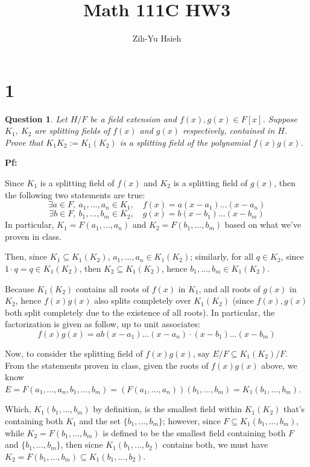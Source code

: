 \documentclass{article}
\title{Math 111C HW3}
\author{Zih-Yu Hsieh}
\newtheorem{question}{Question}
\begin{document}
\maketitle

\section*{1}
\begin{myBox}[]{}
    \begin{question}
        Let $H/F$ be a field extension and $f(x), g(x) \in F[x]$. Suppose $K_1,\ K_2$ are splitting
        fields of $f(x)$ and $g(x)$ respectively, contained in $H$. Prove that $K_1K_2:=K_1(K_2)$ is a
        splitting field of the polynomial $f(x)g(x)$.
    \end{question}
\end{myBox}

\textbf{Pf:}

Since $K_1$ is a splitting field of $f(x)$ and $K_2$ is a splitting field of $g(x)$, then the following two statements are true:
$$\exists a\in F,\ a_1,...,a_n\in K_1,\quad f(x)=a(x-a_1)...(x-a_n)$$
$$\exists b\in F,\ b_1,...,b_m\in K_2,\quad g(x)=b(x-b_1)...(x-b_m)$$
In particular, $K_1=F(a_1,...,a_n)$ and $K_2=F(b_1,...,b_m)$ based on what we've proven in class.

Then, since $K_1\subseteq K_1(K_2)$, $a_1,...,a_n\in K_1(K_2)$; similarly, for all $q\in K_2$, since $1\cdot q=q\in K_1(K_2)$, then $K_2\subseteq K_1(K_2)$, hence $b_1,...,b_m\in K_1(K_2)$.

Because $K_1(K_2)$ contains all roots of $f(x)$ in $K_1$, and all roots of $g(x)$ in $K_2$, hence $f(x)g(x)$ also splits completely over $K_1(K_2)$ (since $f(x),g(x)$ both split completely due to the existence of all roots).
In particular, the factorization is given as follow, up to unit associates:
$$f(x)g(x)=ab(x-a_1)...(x-a_n)\cdot (x-b_1)...(x-b_m)$$

\hfil

Now, to consider the splitting field of $f(x)g(x)$, say $E/F\subseteq K_1(K_2)/F$. From the statements proven in class, given the roots of $f(x)g(x)$ above, we know $E=F(a_1,...,a_n,b_1,...,b_m) = \left(F(a_1,...,a_n)\right)(b_1,...,b_m)=K_1(b_1,...,b_m)$.

Which, $K_1(b_1,...,b_m)$ by definition, is the smallest field within $K_1(K_2)$ that's containing both $K_1$ and the set $\{b_1,...,b_m\}$; however, since $F\subseteq K_1(b_1,...,b_m)$, while $K_2=F(b_1,...,b_m)$ is defined to be the smallest field containing both $F$ and $\{b_1,...,b_m\}$,
then sicne $K_1(b_1,...,b_2)$ contains both, we must have $K_2=F(b_1,...,b_m)\subseteq K_1(b_1,...,b_2)$.
\end{document}
